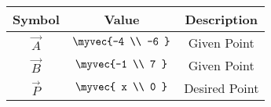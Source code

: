 \begin{tabular}{|c|c|c|}
     \hline
     \textbf{Symbol}& \textbf{Value} & \textbf{Description} \\
     \hline
     $\vec{A}$ & $\myvec{-4 \\ -6 }$ & Given Point \\ 
     \hline
     $\vec{B}$  & $\myvec{-1 \\ 7 }$ & Given Point \\ 
     \hline
     $\vec{P}$ & $\myvec{ x \\ 0 }$ & Desired Point \\ 
     \hline
\end{tabular}
